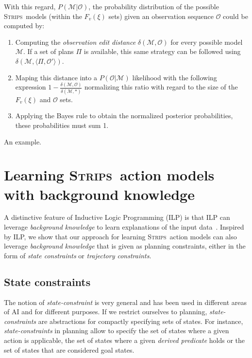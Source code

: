 \documentclass[3p,times]{elsarticle}
\newcommand{\strips}{\textsc{Strips}}     %
\newcommand{\tup}[1]{{\langle #1 \rangle}}
\begin{document}
With this regard, $P(\mathcal{M}|\mathcal{O})$, the probability distribution of the possible \strips\ models (within the $F_v(\xi)$ sets) given an observation sequence $\mathcal{O}$ could be computed by:
\begin{enumerate}
\item Computing the {\em observation edit distance} $\delta(\mathcal{M},\mathcal{O})$ for every possible model $\mathcal{M}$. If a set of plans $\Pi$ is available, this same strategy can be followed using $\delta(\mathcal{M},\tup{\Pi,\mathcal{O'}})$. 
\item  Maping this distance into a $P(\mathcal{O}|\mathcal{M})$ likelihood with the following expression $1-\frac{\delta(\mathcal{M},\mathcal{O})}{\delta(\mathcal{M},*)}$ normalizing this ratio with regard to the size of the $F_v(\xi)$ and $\mathcal{O}$ sets.
\item Applying the Bayes rule to obtain the normalized posterior probabilities, these probabilities must sum 1.
\end{enumerate}

An example.



\section{Learning \strips\ action models with background knowledge}
\label{sec:Section7}
A distinctive feature of Inductive Logic Programming (ILP) is that ILP can leverage {\em background knowledge} to learn explanations of the input data~\cite{muggleton1994inductive}. Inspired by ILP, we show that our approach for learning \strips\ action models can also leverage {\em background knowledge} that is given as planning constraints, either in the form of {\em state constraints} or {\em trajectory constraints}.

\subsection{State constraints}
The notion of {\em state-constraint} is very general and has been used in different areas of AI and for different purposes.  If we restrict ourselves to planning, {\em state-constraints} are abstractions for compactly specifying sets of states. For instance, {\em state-constraints} in planning allow to specify the set of states where a given action is applicable, the set of states where a given {\em derived predicate} holds or the set of states that are considered goal states.
\end{document}
